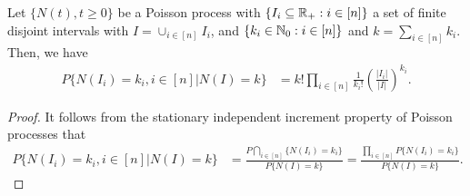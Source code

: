 \documentclass[a4paper,10pt,english]{article}
\begin{document}
\begin{prop}\label{Prop:SIIPoisson}
Let $\{N(t), t\geqslant 0\}$ be a Poisson process with $\{I_i \subseteq \mathbb{R}_+: i \in [n]\}$ a set of finite disjoint intervals with $I = \cup_{i \in [n]}I_i$, and $\{k_i \in \mathbb{N}_0: i \in [n]\}$ and $k = \sum_{i \in [n]}k_i$. 
Then, we have 
\begin{align*}
P\{N(I_i) = k_i, i\in [n] | N(I) = k\} &= k!\prod_{i \in [n]}\frac{1}{k_i!}\left(\frac{|I_i|}{|I|}\right)^{k_i}.
\end{align*}
\end{prop}
\begin{proof}
It follows from the stationary independent increment property of Poisson processes that
\begin{align*}
P\{N(I_i) = k_i, i\in [n] | N(I) = k\} &= \frac{P\bigcap_{i \in [n]}\{N(I_i) = k_i\}}{P\{N(I) = k\}} = \frac{\prod_{i \in [n]}P\{N(I_i) = k_i\}}{P\{N(I)= k\}}.
\end{align*}
\end{proof}
\end{document}
